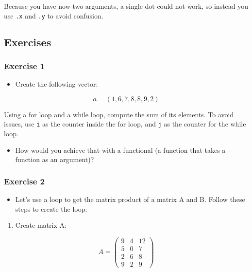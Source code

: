 \documentclass[]{gitbook}
\providecommand{\tightlist}{%
  \setlength{\itemsep}{0pt}\setlength{\parskip}{0pt}}
\theoremstyle{definition}
\theoremstyle{definition}
\theoremstyle{definition}
\theoremstyle{remark}
\begin{document}
Because you have now two arguments, a single dot could not work, so
instead you use \texttt{.x} and \texttt{.y} to avoid confusion.

\hypertarget{exercises-5}{%
\subsection{Exercises}\label{exercises-5}}

\hypertarget{exercise-1-5}{%
\subsubsection*{Exercise 1}\label{exercise-1-5}}

\begin{itemize}
\tightlist
\item
  Create the following vector:
\end{itemize}

\[a = (1,6,7,8,8,9,2)\]

Using a for loop and a while loop, compute the sum of its elements. To
avoid issues, use \texttt{i} as the counter inside the for loop, and
\texttt{j} as the counter for the while loop.

\begin{itemize}
\tightlist
\item
  How would you achieve that with a functional (a function that takes a
  function as an argument)?
\end{itemize}

\hypertarget{exercise-2-3}{%
\subsubsection*{Exercise 2}\label{exercise-2-3}}

\begin{itemize}
\tightlist
\item
  Let's use a loop to get the matrix product of a matrix A and B. Follow
  these steps to create the loop:
\end{itemize}

\begin{enumerate}
\def\labelenumi{\arabic{enumi})}
\tightlist
\item
  Create matrix A:
\end{enumerate}

\[A = \left(
  \begin{array}{ccc}
   9 & 4 & 12 \\
   5 & 0 & 7 \\
   2 & 6 & 8 \\
   9 & 2 & 9
  \end{array} \right)
\]
\end{document}
